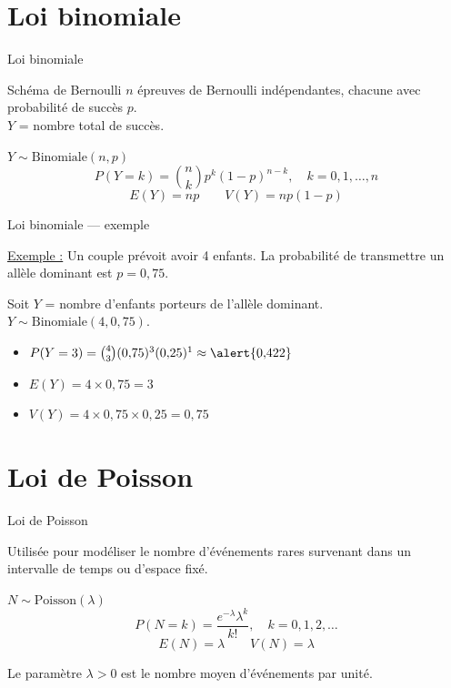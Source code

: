 \documentclass{BeamerTemplate}
\begin{document}
\section{Loi binomiale}

\begin{frame}[t]{Loi binomiale}

\begin{Boite}{Schéma de Bernoulli}
$n$ épreuves de Bernoulli \alert{indépendantes}, chacune avec probabilité de succès $p$.\\
$Y$ = nombre total de succès.
\end{Boite}

\begin{Boite}{$Y \sim \text{Binomiale}(n, p)$}
$$P(Y = k) = \binom{n}{k} p^k (1-p)^{n-k}, \quad k = 0, 1, \ldots, n$$
$$E(Y) = np \qquad V(Y) = np(1-p)$$
\end{Boite}

\end{frame}

\begin{frame}[t]{Loi binomiale — exemple}

\underline{Exemple :} Un couple prévoit avoir 4 enfants. La probabilité de transmettre un allèle dominant est $p = 0{,}75$.

Soit $Y$ = nombre d'enfants porteurs de l'allèle dominant. $Y \sim \text{Binomiale}(4, 0{,}75)$.

\bigskip
\begin{itemize}\itemsep5mm
  \item $P(Y = 3) = \binom{4}{3}(0{,}75)^3(0{,}25)^1 \approx \alert{0{,}422}$
  \item $E(Y) = 4 \times 0{,}75 = 3$
  \item $V(Y) = 4 \times 0{,}75 \times 0{,}25 = 0{,}75$
\end{itemize}

\end{frame}

\section{Loi de Poisson}

\begin{frame}[t]{Loi de Poisson}

Utilisée pour modéliser le \alert{nombre d'événements rares} survenant dans un intervalle de temps ou d'espace fixé.

\begin{Boite}{$N \sim \text{Poisson}(\lambda)$}
$$P(N = k) = \frac{e^{-\lambda}\lambda^k}{k!}, \quad k = 0, 1, 2, \ldots$$
$$E(N) = \lambda \qquad V(N) = \lambda$$
\end{Boite}

\medskip
Le paramètre $\lambda > 0$ est le nombre moyen d'événements par unité.

\end{frame}
\end{document}

